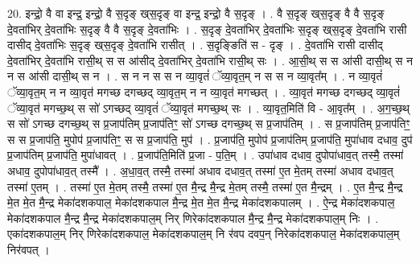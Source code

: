 \documentclass[17pt]{extarticle}
\begin{document}
20. इन्द्रो॒ वै वा इन्द्र॒ इन्द्रो॒ वै स॒दृङ् ख्‌स॒दृङ् वा इन्द्र॒ इन्द्रो॒ वै स॒दृङ् । . वै स॒दृङ् ख्‌स॒दृङ् वै वै स॒दृङ् दे॒वता॑भिर् दे॒वता॑भिः स॒दृङ् वै वै स॒दृङ् दे॒वता॑भिः । . स॒दृङ् दे॒वता॑भिर् दे॒वता॑भिः स॒दृङ् ख्‌स॒दृङ् दे॒वता॑भि रासी दासीद् दे॒वता॑भिः स॒दृङ् ख्‌स॒दृङ् दे॒वता॑भि रासीत् । . स॒दृङ्ङिति॑ स - दृङ् । . दे॒वता॑भि रासी दासीद् दे॒वता॑भिर् दे॒वता॑भि रासी॒थ् स स आ॑सीद् दे॒वता॑भिर् दे॒वता॑भि रासी॒थ् सः । . आ॒सी॒थ् स स आ॑सी दासी॒थ् स न न स आ॑सी दासी॒थ् स न । . स न न स स न व्या॒वृतं॑ ॅव्या॒वृत॒म् न स स न व्या॒वृत᳚म् । . न व्या॒वृतं॑ ॅव्या॒वृत॒म् न न व्या॒वृत॑ मगच्छ दगच्छद् व्या॒वृत॒म् न न व्या॒वृत॑ मगच्छत् । . व्या॒वृत॑ मगच्छ दगच्छद् व्या॒वृतं॑ ॅव्या॒वृत॑ मगच्छ॒थ् स सो॑ ऽगच्छद् व्या॒वृतं॑ ॅव्या॒वृत॑ मगच्छ॒थ् सः । . व्या॒वृत॒मिति॑ वि - आ॒वृत᳚म् । . अ॒ग॒च्छ॒थ् स सो॑ ऽगच्छ दगच्छ॒थ् स प्र॒जाप॑तिम् प्र॒जाप॑तिꣳ॒॒ सो॑ ऽगच्छ दगच्छ॒थ् स प्र॒जाप॑तिम् । . स प्र॒जाप॑तिम् प्र॒जाप॑तिꣳ॒॒ स स प्र॒जाप॑ति॒ मुपोप॑ प्र॒जाप॑तिꣳ॒॒ स स प्र॒जाप॑ति॒ मुप॑ । . प्र॒जाप॑ति॒ मुपोप॑ प्र॒जाप॑तिम् प्र॒जाप॑ति॒ मुपा॑धाव दधाव॒ दुप॑ प्र॒जाप॑तिम् प्र॒जाप॑ति॒ मुपा॑धावत् । . प्र॒जाप॑ति॒मिति॑ प्र॒जा - प॒ति॒म् । . उपा॑धाव दधाव॒ दुपोपा॑धाव॒त् तस्मै॒ तस्मा॑ अधाव॒ दुपोपा॑धाव॒त् तस्मै᳚ । . अ॒धा॒व॒त् तस्मै॒ तस्मा॑ अधाव दधाव॒त् तस्मा॑ ए॒त मे॒तम् तस्मा॑ अधाव दधाव॒त् तस्मा॑ ए॒तम् । . तस्मा॑ ए॒त मे॒तम् तस्मै॒ तस्मा॑ ए॒त मै॒न्द्र मै॒न्द्र मे॒तम् तस्मै॒ तस्मा॑ ए॒त मै॒न्द्रम् । . ए॒त मै॒न्द्र मै॒न्द्र मे॒त मे॒त मै॒न्द्र मेका॑दशकपाल॒ मेका॑दशकपाल मै॒न्द्र मे॒त मे॒त मै॒न्द्र मेका॑दशकपालम् । . ऐ॒न्द्र मेका॑दशकपाल॒ मेका॑दशकपाल मै॒न्द्र मै॒न्द्र मेका॑दशकपाल॒म् निर् णिरेका॑दशकपाल मै॒न्द्र मै॒न्द्र मेका॑दशकपाल॒म् निः । . एका॑दशकपाल॒म् निर् णिरेका॑दशकपाल॒ मेका॑दशकपाल॒म् नि र॑वप दवप॒न् निरेका॑दशकपाल॒ मेका॑दशकपाल॒म् निर॑वपत् । \newline
\end{document}
